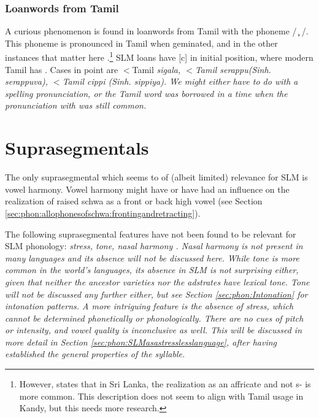 \subsubsection{Loanwords from Tamil}
A curious phenomenon is found in loanwords from Tamil with the phoneme / {\btam \c \etam } /. This phoneme is pronounced  in Tamil when geminated, and  in the other instances that matter here \citep[cf.][9,13]{Schiffman1999}.\footnote{However, \citet[174]{Suseendirarajah1973phon} states that in Sri Lanka, the realization as an affricate and not s- is more common. This description does not seem to align with Tamil usage in Kandy, but this needs more research.} SLM loans have [c] in initial position, where modern Tamil has .  Cases in point are $<$Tamil \em si\ng gala\em, $<$Tamil \em serappu\em (Sinh. \em serappuva\em),  $<$Tamil \em cippi \em (Sinh. \em sippiya\em). We might either have to do with a spelling pronunciation, or the Tamil word was borrowed in a time when the pronunciation with  was still common.


\section{Suprasegmentals}\label{sec:phon:Suprasegmentals}
The only suprasegmental which seems to of (albeit limited) relevance for SLM is vowel harmony. Vowel harmony might have or have had an influence on the realization  of raised schwa as a front or back high vowel (see Section \ref{sec:phon:allophonesofschwa:frontingandretracting}).

The following suprasegmental features have not been found to be relevant for SLM phonology: \em stress, tone, nasal harmony \em.
Nasal harmony is not present in many languages and its absence will not be discussed here.
While tone is more common in the world's languages, its absence in SLM is not surprising either, given that neither the ancestor varieties nor the adstrates have lexical tone. Tone will not be discussed any further either, but see Section \ref{sec:phon:Intonation} for intonation patterns.
 A more intriguing feature is the absence of stress, which cannot be determined phonetically or phonologically. There are no cues of pitch or intensity, and vowel quality is inconclusive as well. This will be discussed in more detail in Section \ref{sec:phon:SLMasastresslesslanguage}, after having established the general properties of the syllable.


